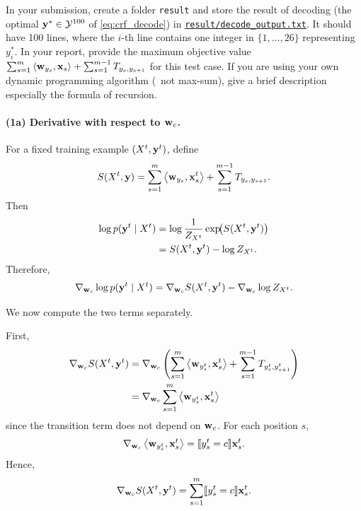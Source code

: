 \documentclass[11pt]{report}
\begin{document}
\begin{itemize}
	\begin{center}
	\end{center}
	
	In your submission, create a folder \verb#result# and store the result of decoding (the optimal $\mathbf{\boldsymbol{y}}^* \in \mathcal{Y}^{100}$ of \eqref{eq:crf_decode}) in \underline{\texttt{result/decode\_output.txt}}.
	It should have 100 lines,
	where the $i$-th line contains one integer in $\{1,\ldots,26\}$ representing $y^*_i$.
	In your report, provide the maximum objective value $\sum_{s=1}^m \left\langle \mathbf{\boldsymbol{w}}_{y_s},\mathbf{\boldsymbol{x}}_s \right\rangle + \sum_{s=1}^{m-1} T_{y_s, y_{s+1}}$ for this test case.
	If you are using your own dynamic programming algorithm (\ie\ not max-sum),
	give a brief description especially the formula of recursion.
\end{itemize}


\paragraph{(1a) Derivative with respect to $\mathbf{\boldsymbol{w}}_c$.}
For a fixed training example $(X^t,\mathbf{\boldsymbol{y}}^t)$, define
\begin{align}
S(X^t,\mathbf{\boldsymbol{y}})
=
\sum_{s=1}^m \left\langle \mathbf{\boldsymbol{w}}_{y_s},\mathbf{\boldsymbol{x}}_s^t \right\rangle
+
\sum_{s=1}^{m-1} T_{y_s,y_{s+1}}.
\end{align}
Then
\begin{align}
\log p(\mathbf{\boldsymbol{y}}^t \mid X^t)
&=
\log \frac{1}{Z_{X^t}} \exp\!\bigl(S(X^t,\mathbf{\boldsymbol{y}}^t)\bigr) \\
&=
S(X^t,\mathbf{\boldsymbol{y}}^t) - \log Z_{X^t}.
\end{align}
Therefore,
\begin{align}
{\nabla}_{\mathbf{\boldsymbol{w}}_c}\log p(\mathbf{\boldsymbol{y}}^t \mid X^t)
=
{\nabla}_{\mathbf{\boldsymbol{w}}_c} S(X^t,\mathbf{\boldsymbol{y}}^t)
-
{\nabla}_{\mathbf{\boldsymbol{w}}_c}\log Z_{X^t}.
\end{align}

We now compute the two terms separately.

First,
\begin{align}
{\nabla}_{\mathbf{\boldsymbol{w}}_c} S(X^t,\mathbf{\boldsymbol{y}}^t)
&=
{\nabla}_{\mathbf{\boldsymbol{w}}_c}
\left(
\sum_{s=1}^m \left\langle \mathbf{\boldsymbol{w}}_{y_s^t},\mathbf{\boldsymbol{x}}_s^t \right\rangle
+
\sum_{s=1}^{m-1} T_{y_s^t,y_{s+1}^t}
\right) \\
&=
{\nabla}_{\mathbf{\boldsymbol{w}}_c}
\sum_{s=1}^m \left\langle \mathbf{\boldsymbol{w}}_{y_s^t},\mathbf{\boldsymbol{x}}_s^t \right\rangle
\end{align}
since the transition term does not depend on $\mathbf{\boldsymbol{w}}_c$. For each position $s$,
\begin{align}
{\nabla}_{\mathbf{\boldsymbol{w}}_c}\left\langle \mathbf{\boldsymbol{w}}_{y_s^t},\mathbf{\boldsymbol{x}}_s^t \right\rangle
=
\llbracket y_s^t = c \rrbracket \mathbf{\boldsymbol{x}}_s^t.
\end{align}
Hence,
\begin{align}
{\nabla}_{\mathbf{\boldsymbol{w}}_c} S(X^t,\mathbf{\boldsymbol{y}}^t)
=
\sum_{s=1}^m \llbracket y_s^t = c \rrbracket \mathbf{\boldsymbol{x}}_s^t.
\end{align}
\end{document}
